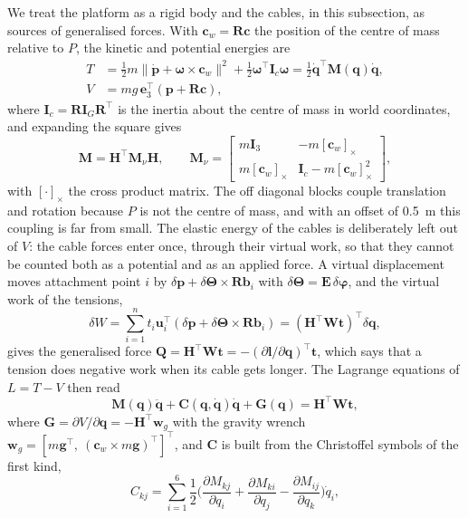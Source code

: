 \documentclass{interact}
\newcommand{\vc}[1]{\bm{#1}}
\newcommand{\mt}[1]{\mathbf{#1}}
\newcommand{\sk}[1]{[#1]_{\times}}
\newcommand{\eye}{\mt{I}}
\begin{document}
We treat the platform as a rigid body and the cables, in this subsection, as sources of generalised forces. With $\vc c_w=\mt R\vc c$ the position of the centre of mass relative to $P$, the kinetic and potential energies are
\begin{align}
T&=\tfrac12 m\lVert\dot{\vc p}+\vc\omega\times\vc c_w\rVert^2+\tfrac12\vc\omega^\top\mt I_c\vc\omega=\tfrac12\dot{\vc q}^\top\mt M(\vc q)\dot{\vc q},\label{eq:T}\\
V&=m g\,\vc e_3^\top(\vc p+\mt R\vc c),\label{eq:V}
\end{align}
where $\mt I_c=\mt R\mt I_G\mt R^\top$ is the inertia about the centre of mass in world coordinates, and expanding the square gives
\begin{equation}\label{eq:M}
\mt M=\mt H^\top\mt M_\nu\mt H,\qquad
\mt M_\nu=\begin{bmatrix}m\eye_3&-m\sk{\vc c_w}\\ m\sk{\vc c_w}&\mt I_c-m\sk{\vc c_w}^2\end{bmatrix},
\end{equation}
with $\sk{\cdot}$ the cross product matrix. The off diagonal blocks couple translation and rotation because $P$ is not the centre of mass, and with an offset of 0.5~m this coupling is far from small. The elastic energy of the cables is deliberately left out of $V$: the cable forces enter once, through their virtual work, so that they cannot be counted both as a potential and as an applied force. A virtual displacement moves attachment point $i$ by $\delta\vc p+\delta\vc\Theta\times\mt R\vc b_i$ with $\delta\vc\Theta=\mt E\,\delta\vc\varphi$, and the virtual work of the tensions,
\begin{equation}\label{eq:Q}
\delta W=\sum_{i=1}^n t_i\vc u_i^\top(\delta\vc p+\delta\vc\Theta\times\mt R\vc b_i)=(\mt H^\top\mt W\vc t)^\top\delta\vc q,
\end{equation}
gives the generalised force $\vc Q=\mt H^\top\mt W\vc t=-(\partial\vc l/\partial\vc q)^\top\vc t$, which says that a tension does negative work when its cable gets longer. The Lagrange equations of $L=T-V$ then read
\begin{equation}\label{eq:EL}
\mt M(\vc q)\ddot{\vc q}+\mt C(\vc q,\dot{\vc q})\dot{\vc q}+\vc G(\vc q)=\mt H^\top\mt W\vc t,
\end{equation}
where $\vc G=\partial V/\partial\vc q=-\mt H^\top\vc w_g$ with the gravity wrench $\vc w_g=[m\vc g^\top,\ (\vc c_w\times m\vc g)^\top]^\top$, and $\mt C$ is built from the Christoffel symbols of the first kind,
\begin{equation}\label{eq:C}
C_{kj}=\sum_{i=1}^{6}\frac12\Big(\frac{\partial M_{kj}}{\partial q_i}+\frac{\partial M_{ki}}{\partial q_j}-\frac{\partial M_{ij}}{\partial q_k}\Big)\dot q_i,
\end{equation}
\end{document}

